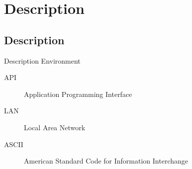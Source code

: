 \section{Description}
\subsection{Description}
\label{description}
\begin{frame}{Description Environment}
  \begin{description}
    \item[API] Application Programming Interface
    \item[LAN] Local Area Network
    \item[ASCII] American Standard Code for Information Interchange
  \end{description}
\end{frame}
